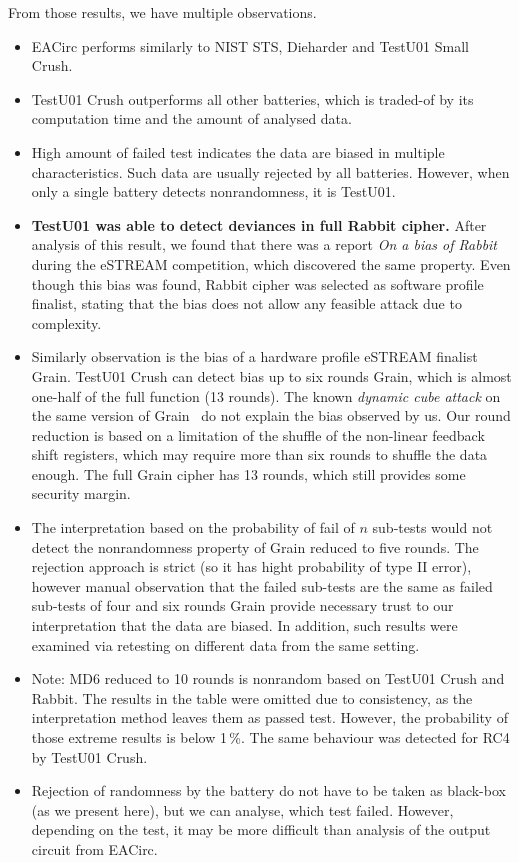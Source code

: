 \documentclass[
  print, %
  Table,   %
  nolof,     %
  nolot,     %
  11pt, %
  oneside  %
]{fithesis3}
\begin{document}
From those results, we have multiple observations.

\begin{itemize}
    \item EACirc performs similarly to NIST STS, Dieharder and TestU01 Small Crush.
    \item TestU01 Crush outperforms all other batteries, which is traded-of by its computation time and the amount of analysed data.
    \item High amount of failed test indicates the data are biased in multiple characteristics. Such data are usually rejected by all batteries. However, when only a single battery detects nonrandomness, it is TestU01.
    \item \textbf{TestU01 was able to detect deviances in full Rabbit cipher.} After analysis of this result, we found that there was a report \textit{On a bias of Rabbit}~\cite{aumasson2007bias} during the eSTREAM competition, which discovered the same property. Even though this bias was found, Rabbit cipher was selected as software profile finalist, stating that the bias does not allow any feasible attack due to complexity.
    \item Similarly observation is the bias of a hardware profile eSTREAM finalist Grain. TestU01 Crush can detect bias up to six rounds Grain, which is almost one-half of the full function (13 rounds). The known \textit{dynamic cube attack} on the same version of Grain~\cite{dinur2011breaking} do not explain the bias observed by us. Our round reduction is based on a limitation of the shuffle of the non-linear feedback shift registers, which may require more than six rounds to shuffle the data enough. The full Grain cipher has 13 rounds, which still provides some security margin.
    \item The interpretation based on the probability of fail of $n$ sub-tests would not detect the nonrandomness property of Grain reduced to five rounds. The rejection approach is strict (so it has hight probability of type II error), however manual observation that the failed sub-tests are the same as failed sub-tests of four and six rounds Grain provide necessary trust to our interpretation that the data are biased. In addition, such results were examined via retesting on different data from the same setting.
    \item Note: MD6 reduced to 10 rounds is nonrandom based on TestU01 Crush and Rabbit. The results in the table were omitted due to consistency, as the interpretation method leaves them as passed test. However, the probability of those extreme results is below 1\,\%. The same behaviour was detected for RC4 by TestU01 Crush.
    \item Rejection of randomness by the battery do not have to be taken as black-box (as we present here), but we can analyse, which test failed. However, depending on the test, it may be more difficult than analysis of the output circuit from EACirc.


\end{itemize}
\end{document}
